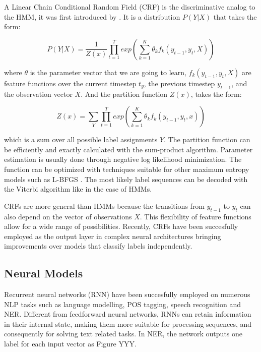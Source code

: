 \documentclass[sigconf]{acmart}
\begin{document}
A Linear Chain Conditional Random Field (CRF) is the discriminative analog to the HMM,
it was first introduced by \cite{Lafferty2001}. It is a distribution $ P(Y|X) $ that takes the form:

\begin{equation}
P(Y|X) = \frac{1}{Z(x)} \prod_{t=1}^{T} exp \left( \sum_{k=1}^{K} \theta_k f_k(y_{t-1}, y_t, X) \right)
\end{equation}

where $ \theta $ is the parameter vector that we are going to learn, $ f_k(y_{t-1}, y_{t}, X) $ 
are feature functions over the current timestep $ t_y $, the previous timestep $ y_{t-1}$, 
and the observation vector $ X $. And the partition function $ Z(x) $, takes the form:

\begin{equation}
Z(x) = \sum_{Y} \prod_{t=1}^{T} exp \left( \sum_{k=1}^{K} \theta_k f_k(y_{t-1}, y_t, x) \right)
\end{equation}

which is a sum over all possible label assignments $ Y $. The partition function can be efficiently
and exactly calculated with the sum-product algorithm. Parameter estimation is usually done through 
negative log likelihood minimization. The function can be optimized with techniques suitable for other 
maximum entropy models such as L-BFGS \cite{Liu1989}. The most likely label sequences can be decoded 
with the Viterbi algorithm like in the case of HMMs.

CRFs are more general than HMMs because the transitions from $ y_{t-1} $ to $ y_{t} $ can also depend 
on the vector of observations $ X $. This flexibility of feature functions allow for a wide range of
possibilities. Recently, CRFs have been succesfully employed as the output layer in complex neural 
architectures bringing improvements over models that classify labels independently.

\subsection{Neural Models}

Recurrent neural networks (RNN) have been succesfully employed on numerous NLP tasks such as
language modelling, POS tagging, speech recognition and NER. Different from feedforward neural networks, 
RNNs can retain information in their internal state, making them more suitable for processing sequences, 
and consequently for solving text related tasks. In NER, the network outputs one label for each input 
vector as Figure YYY. 
\end{document}
